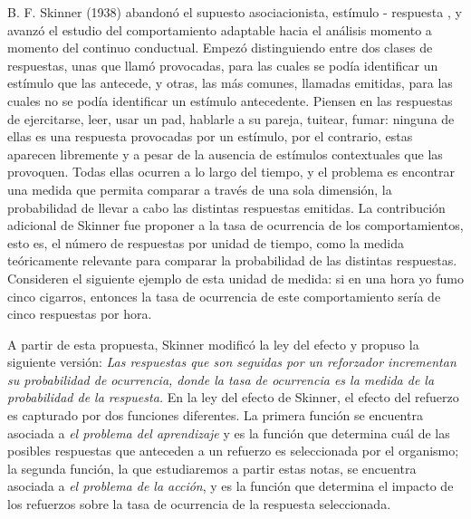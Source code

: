 \documentclass[
  letterpaper,
]{book}
\begin{document}
B. F. Skinner (1938) abandonó el supuesto asociacionista, estímulo -
respuesta , y avanzó el estudio del comportamiento adaptable hacia el
análisis momento a momento del continuo conductual. Empezó distinguiendo
entre dos clases de respuestas, unas que llamó provocadas, para las
cuales se podía identificar un estímulo que las antecede, y otras, las
más comunes, llamadas emitidas, para las cuales no se podía identificar
un estímulo antecedente. Piensen en las respuestas de ejercitarse, leer,
usar un pad, hablarle a su pareja, tuitear, fumar: ninguna de ellas es
una respuesta provocadas por un estímulo, por el contrario, estas
aparecen libremente y a pesar de la ausencia de estímulos contextuales
que las provoquen. Todas ellas ocurren a lo largo del tiempo, y el
problema es encontrar una medida que permita comparar a través de una
sola dimensión, la probabilidad de llevar a cabo las distintas
respuestas emitidas. La contribución adicional de Skinner fue proponer a
la tasa de ocurrencia de los comportamientos, esto es, el número de
respuestas por unidad de tiempo, como la medida teóricamente relevante
para comparar la probabilidad de las distintas respuestas. Consideren el
siguiente ejemplo de esta unidad de medida: si en una hora yo fumo cinco
cigarros, entonces la tasa de ocurrencia de este comportamiento sería de
cinco respuestas por hora.

A partir de esta propuesta, Skinner modificó la ley del efecto y propuso
la siguiente versión: \emph{Las respuestas que son seguidas por un
reforzador incrementan su probabilidad de ocurrencia, donde la tasa de
ocurrencia es la medida de la probabilidad de la respuesta.} En la ley
del efecto de Skinner, el efecto del refuerzo es capturado por dos
funciones diferentes. La primera función se encuentra asociada a
\emph{el problema del aprendizaje} y es la función que determina cuál de
las posibles respuestas que anteceden a un refuerzo es seleccionada por
el organismo; la segunda función, la que estudiaremos a partir estas
notas, se encuentra asociada a \emph{el problema de la acción}, y es la
función que determina el impacto de los refuerzos sobre la tasa de
ocurrencia de la respuesta seleccionada.
\end{document}
